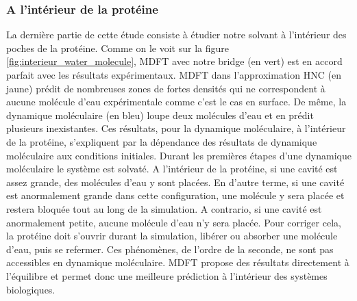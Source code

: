 \subsubsection{A l'intérieur de la protéine}
La dernière partie de cette étude consiste à étudier notre solvant à l'intérieur des poches de la protéine. Comme on le voit sur la figure \ref{fig:interieur_water_molecule}, MDFT avec notre bridge (en vert) est en accord parfait avec les résultats expérimentaux. MDFT dans l'approximation HNC (en jaune) prédit de nombreuses zones de fortes densités qui ne correspondent à aucune molécule d'eau expérimentale comme c'est le cas en surface. De même, la dynamique moléculaire (en bleu) loupe deux molécules d'eau et en prédit plusieurs inexistantes. Ces résultats, pour la dynamique moléculaire, à l'intérieur de la protéine, s'expliquent par la dépendance des résultats de dynamique moléculaire aux conditions initiales. Durant les premières étapes d'une dynamique moléculaire le système est solvaté. A l'intérieur de la protéine, si une cavité est assez grande, des molécules d'eau y sont placées. En d'autre terme, si une cavité est anormalement grande dans cette configuration, une molécule y sera placée et restera bloquée tout au long de la simulation. A contrario, si une cavité est anormalement petite, aucune molécule d'eau n'y sera placée. Pour corriger cela, la protéine doit s'ouvrir durant la simulation, libérer ou absorber une molécule d'eau, puis se refermer. Ces phénomènes, de l'ordre de la seconde, ne sont pas accessibles en dynamique moléculaire. MDFT propose des résultats directement à l'équilibre et permet donc une meilleure prédiction à l'intérieur des systèmes biologiques.




\begin{center}
    \captionsetup{type=figure}
      \label{fig:interieur_water_molecule}
\end{center}




